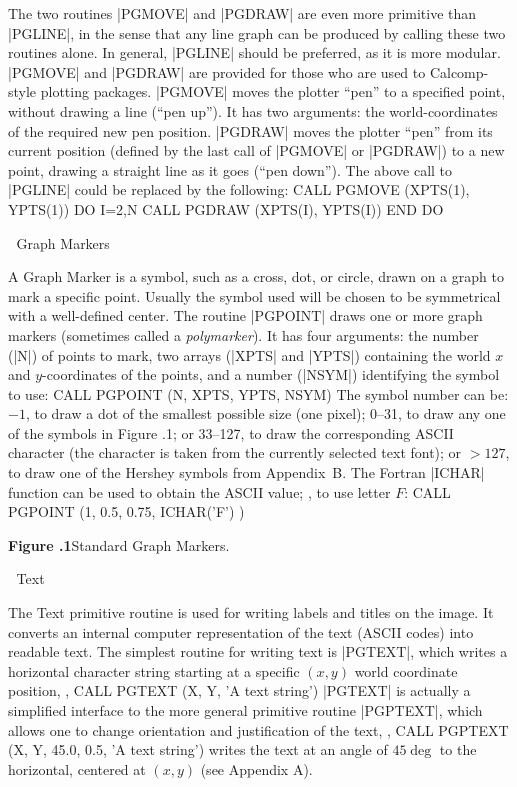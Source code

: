 The two routines |PGMOVE| and |PGDRAW| are even more primitive than 
|PGLINE|, in the sense
that any line graph can be produced by calling these two routines alone.
In general, |PGLINE| should be preferred, as it is more
modular. |PGMOVE|
and |PGDRAW| are provided for those who are used to Calcomp-style plotting
packages.  |PGMOVE| moves the plotter ``pen'' to a specified point, without 
drawing a line (``pen up''). It has two arguments: the world-coordinates of the
required new pen position.  |PGDRAW| moves the plotter ``pen'' from its 
current position (defined by the last call of |PGMOVE| or |PGDRAW|) to a new 
point, drawing a straight line as it goes (``pen down'').  The above call to
|PGLINE| could be replaced by the following:
\begintt
CALL PGMOVE (XPTS(1), YPTS(1))
DO I=2,N
    CALL PGDRAW (XPTS(I), YPTS(I))
END DO
\endtt


\beginsection Graph Markers

A Graph Marker is a symbol, such as a cross, dot, or circle, drawn on a graph 
to mark a specific point. Usually the symbol used will be chosen to be 
symmetrical with a well-defined center. The routine |PGPOINT| draws one 
or more graph markers (sometimes called a {\it polymarker\/}).
It has four arguments: the number 
(|N|) of points to mark, two arrays (|XPTS| and 
|YPTS|) containing the world $x$ and $y$-coordinates of the points, and 
a number (|NSYM|) identifying the symbol to use:
\begintt
CALL PGPOINT (N, XPTS, YPTS, NSYM)
\endtt
The symbol number can be: $-1$, to draw a dot of the smallest possible 
size (one pixel); 0--31, to draw any one of the symbols in Figure
\the\chapnum.1; or 33--127, to draw the corresponding ASCII character
(the character is taken from the currently selected text font); or 
$>127$, to draw one of the Hershey symbols from Appendix~B. The 
Fortran |ICHAR| function can be used to obtain the ASCII value; \eg, to 
use letter $F$:
\begintt
CALL PGPOINT (1, 0.5, 0.75, ICHAR('F') )
\endtt

\pageinsert
{}
\smallskip
\centerline{{\bf Figure \the\chapnum.1}\quad Standard Graph Markers.}
\endinsert


\beginsection Text

The Text primitive routine is used for writing labels and titles
on the image.  It converts an internal computer representation of the
text (ASCII codes) into readable text.  The simplest routine for
writing text is |PGTEXT|, which writes a horizontal character string 
starting at a specific $(x,y)$ world coordinate position, \eg,
\begintt
CALL PGTEXT (X, Y, 'A text string')
\endtt
|PGTEXT| is actually a simplified interface to the more general
primitive routine |PGPTEXT|, which allows one to
change orientation and justification of the text, \eg,
\begintt
CALL PGPTEXT (X, Y, 45.0, 0.5, 'A text string')
\endtt
writes the text at an angle of $45\deg$ to the horizontal, centered
at $(x,y)$ (see Appendix A).

